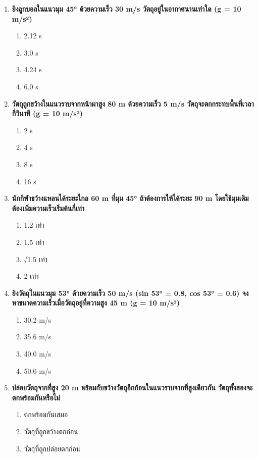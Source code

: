 \documentclass[12pt]{article}
\begin{document}
\begin{enumerate}
\begin{enumerate}[label=\alph*)]
\item 64 m
\item 80 m
\item 128 m
\end{enumerate}
\item \textbf{ยิงลูกบอลในแนวมุม 45° ด้วยความเร็ว 30 m/s วัตถุอยู่ในอากาศนานเท่าใด (g = 10 m/s²)}
\begin{enumerate}[label=\alph*)]
\item 2.12 s
\item 3.0 s
\item 4.24 s
\item 6.0 s
\end{enumerate}
\item \textbf{วัตถุถูกขว้างในแนวราบจากหน้าผาสูง 80 m ด้วยความเร็ว 5 m/s วัตถุจะตกกระทบพื้นที่เวลากี่วินาที (g = 10 m/s²)}
\begin{enumerate}[label=\alph*)]
\item 2 s
\item 4 s
\item 8 s
\item 16 s
\end{enumerate}
\item \textbf{นักกีฬาขว้างแหลนได้ระยะไกล 60 m ที่มุม 45° ถ้าต้องการให้ได้ระยะ 90 m โดยใช้มุมเดิม ต้องเพิ่มความเร็วเริ่มต้นกี่เท่า}
\begin{enumerate}[label=\alph*)]
\item 1.2 เท่า
\item 1.5 เท่า
\item √1.5 เท่า
\item 2 เท่า
\end{enumerate}
\item \textbf{ยิงวัตถุในแนวมุม 53° ด้วยความเร็ว 50 m/s (sin 53° = 0.8, cos 53° = 0.6) จงหาขนาดความเร็วเมื่อวัตถุอยู่ที่ความสูง 45 m (g = 10 m/s²)}
\begin{enumerate}[label=\alph*)]
\item 30.2 m/s
\item 35.6 m/s
\item 40.0 m/s
\item 50.0 m/s
\end{enumerate}
\item \textbf{ปล่อยวัตถุจากที่สูง 20 m พร้อมกับขว้างวัตถุอีกก้อนในแนวราบจากที่สูงเดียวกัน วัตถุทั้งสองจะตกพร้อมกันหรือไม่}
\begin{enumerate}[label=\alph*)]
\item ตกพร้อมกันเสมอ
\item วัตถุที่ถูกขว้างตกก่อน
\item วัตถุที่ถูกปล่อยตกก่อน

\end{enumerate}
\end{enumerate}
\end{document}

